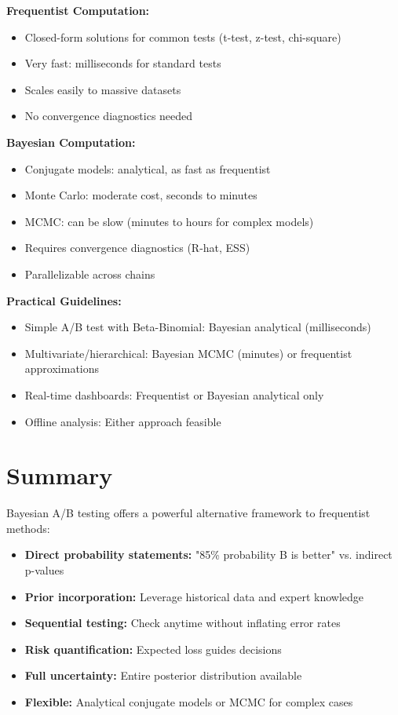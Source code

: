 \textbf{Frequentist Computation:}
\begin{itemize}
    \item Closed-form solutions for common tests (t-test, z-test, chi-square)
    \item Very fast: milliseconds for standard tests
    \item Scales easily to massive datasets
    \item No convergence diagnostics needed
\end{itemize}

\textbf{Bayesian Computation:}
\begin{itemize}
    \item Conjugate models: analytical, as fast as frequentist
    \item Monte Carlo: moderate cost, seconds to minutes
    \item MCMC: can be slow (minutes to hours for complex models)
    \item Requires convergence diagnostics (R-hat, ESS)
    \item Parallelizable across chains
\end{itemize}

\textbf{Practical Guidelines:}
\begin{itemize}
    \item Simple A/B test with Beta-Binomial: Bayesian analytical (milliseconds)
    \item Multivariate/hierarchical: Bayesian MCMC (minutes) or frequentist approximations
    \item Real-time dashboards: Frequentist or Bayesian analytical only
    \item Offline analysis: Either approach feasible
\end{itemize}

\section{Summary}

Bayesian A/B testing offers a powerful alternative framework to frequentist methods:

\begin{itemize}
    \item \textbf{Direct probability statements:} "85\% probability B is better" vs. indirect p-values
    \item \textbf{Prior incorporation:} Leverage historical data and expert knowledge
    \item \textbf{Sequential testing:} Check anytime without inflating error rates
    \item \textbf{Risk quantification:} Expected loss guides decisions
    \item \textbf{Full uncertainty:} Entire posterior distribution available
    \item \textbf{Flexible:} Analytical conjugate models or MCMC for complex cases
\end{itemize}

